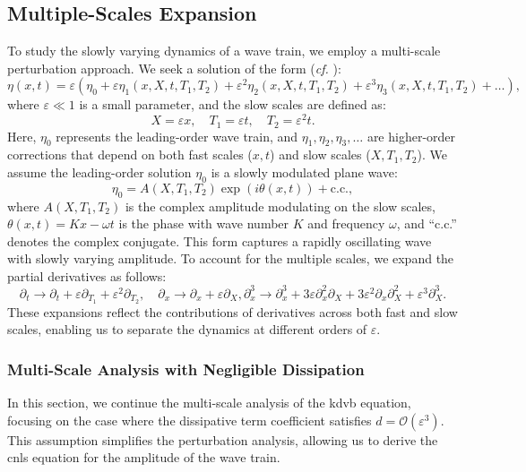 \documentclass[alpha-refs, 12pt]{wiley-article}
\renewcommand{\O}{\mathcal{O}}
\newcommand{\eps}{\varepsilon}
\begin{document}
\subsection*{Multiple-Scales Expansion}

To study the slowly varying dynamics of a wave train, we employ a multi-scale perturbation approach. We seek a solution of the form (\emph{cf.} \cite{Dias2005}):
\begin{equation}
  \label{eq:ansatz}
  \eta(x,t) = \eps \left( \eta_0 + \eps \eta_1(x, X, t, T_1, T_2) + \eps^2 \eta_2(x, X, t, T_1, T_2) + \eps^3 \eta_3(x, X, t, T_1, T_2) + \dots \right),
\end{equation}
where $\eps \ll 1$ is a small parameter, and the slow scales are defined as:
\[
  X = \eps x, \quad T_1 = \eps t, \quad T_2 = \eps^2 t.
\]
Here, $\eta_0$ represents the leading-order wave train, and $\eta_1, \eta_2, \eta_3, \dots$ are higher-order corrections that depend on both fast scales ($x, t$) and slow scales ($X, T_1, T_2$). We assume the leading-order solution $\eta_0$ is a slowly modulated plane wave:
\begin{equation}\label{eq:wave_train}
  \eta_0 = A(X, T_1, T_2) \exp(i \theta(x, t)) + \text{c.c.},
\end{equation}
where $A(X, T_1, T_2)$ is the complex amplitude modulating on the slow scales, $\theta(x, t) = K x - \omega t$ is the phase with wave number $K$ and frequency $\omega$, and ``c.c.'' denotes the complex conjugate. This form captures a rapidly oscillating wave with slowly varying amplitude. To account for the multiple scales, we expand the partial derivatives as follows:
\begin{equation*}\label{eq:derivative_expansion}
  \partial_t \rightarrow \partial_t + \eps \partial_{T_1} + \eps^2 \partial_{T_2}, \quad \partial_x \rightarrow \partial_x + \eps \partial_X, \partial_x^3 \rightarrow \partial_x^3 + 3 \eps \partial_x^2 \partial_X + 3 \eps^2 \partial_x \partial_X^2 + \eps^3 \partial_X^3.
\end{equation*}
These expansions reflect the contributions of derivatives across both fast and slow scales, enabling us to separate the dynamics at different orders of $\eps$.

\subsubsection{Multi-Scale Analysis with Negligible Dissipation}

In this section, we continue the multi-scale analysis of the \acrshort{kdvb} equation, focusing on the case where the dissipative term coefficient satisfies $d = \O(\eps^3)$. This assumption simplifies the perturbation analysis, allowing us to derive the \acrfull{cnls} equation for the amplitude of the wave train.
\end{document}

